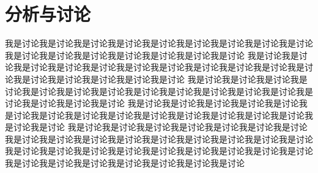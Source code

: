\chapter{分析与讨论}

我是讨论我是讨论我是讨论我是讨论我是讨论我是讨论我是讨论我是讨论我是讨论我是讨论我是讨论我是讨论我是讨论我是讨论我是讨论我是讨论
我是讨论我是讨论我是讨论我是讨论我是讨论我是讨论我是讨论我是讨论我是讨论我是讨论我是讨论我是讨论我是讨论我是讨论我是讨论我是讨论
我是讨论我是讨论我是讨论我是讨论我是讨论我是讨论我是讨论我是讨论我是讨论我是讨论我是讨论我是讨论我是讨论我是讨论我是讨论我是讨论
我是讨论我是讨论我是讨论我是讨论我是讨论我是讨论我是讨论我是讨论我是讨论我是讨论我是讨论我是讨论我是讨论我是讨论我是讨论我是讨论
我是讨论我是讨论我是讨论我是讨论我是讨论我是讨论我是讨论我是讨论我是讨论我是讨论我是讨论我是讨论我是讨论我是讨论我是讨论我是讨论
我是讨论我是讨论我是讨论我是讨论我是讨论我是讨论我是讨论我是讨论我是讨论我是讨论我是讨论我是讨论我是讨论我是讨论我是讨论我是讨论

